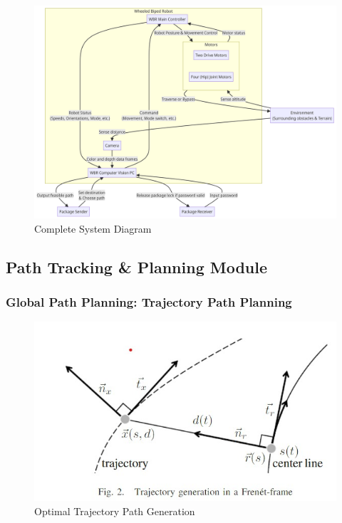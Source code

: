 \documentclass[12pt]{article}
\begin{document}
    \begin{figure}[H]
        \centering
        \includegraphics[width=\textwidth,height=\textheight,keepaspectratio]{../Complete System Diagram.png}
        \caption{Complete System Diagram}
    \end{figure}
    \newpage
    \subsection{Path Tracking \& Planning Module}
        \subsubsection{Global Path Planning: Trajectory Path Planning}
            \begin{figure}[H]
                \centering
                \includegraphics{../Trajectory.jpg}
                \caption{Optimal Trajectory Path Generation}
            \end{figure} 
\end{document}
